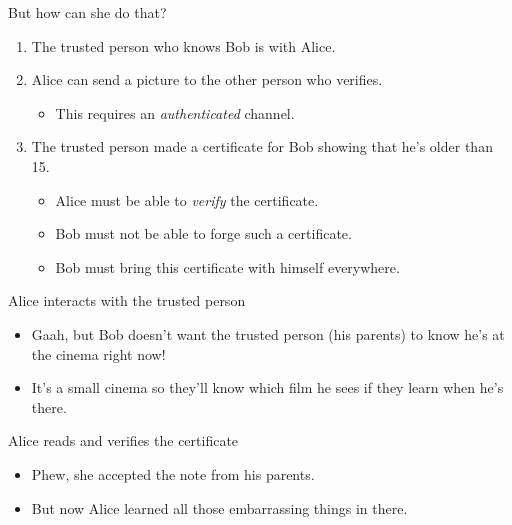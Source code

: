\begin{frame}
  \begin{alertblock}{But how can she do that?}
    \begin{enumerate}
      \item The trusted person who knows Bob is with Alice.

        \pause

      \item Alice can send a picture to the other person who verifies.
        \begin{itemize}
          \item This requires an \emph{authenticated} channel.
        \end{itemize}

        \pause

      \item The trusted person made a certificate for Bob showing that he's 
        older than 15.
        \begin{itemize}
          \item Alice must be able to \emph{verify} the certificate.
          \item Bob must not be able to forge such a certificate.
          \item Bob must bring this certificate with himself everywhere.
        \end{itemize}

    \end{enumerate}
  \end{alertblock}
\end{frame}

\begin{frame}
  \begin{alertblock}{Alice interacts with the trusted person}
    \begin{itemize}
      \item Gaah, but Bob doesn't want the trusted person (his parents) to know 
        he's at the cinema right now!
      \item It's a small cinema so they'll know which film he sees if they 
        learn when he's there.
    \end{itemize}
  \end{alertblock}

  \pause

  \begin{alertblock}{Alice reads and verifies the certificate}
    \begin{itemize}
      \item Phew, she accepted the note from his parents.
      \item But now Alice learned all those embarrassing things in 
        there.
    \end{itemize}
  \end{alertblock}
\end{frame}

